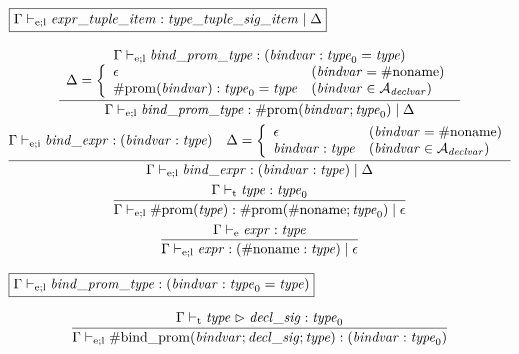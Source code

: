 $\fbox{$\Gamma \vdash_{\mathrm{e}; \mathrm{l}} \mathit{expr\_tuple\_item}: \mathit{type\_tuple\_sig\_item} \mid \Delta$}$

\begin{gather*}
    \infer{\Gamma \vdash_{\mathrm{e}; \mathrm{l}} \mathit{bind\_prom\_type}: \mathrm{\#prom}(\mathit{bindvar}; \mathit{type}_0) \mid \Delta}{
        \begin{array}{c}
            \Gamma \vdash_{\mathrm{e}; \mathrm{l}} \mathit{bind\_prom\_type}: (\mathit{bindvar}: \mathit{type}_0 = \mathit{type})
            \\
            \Delta = \left\{\begin{array}{ll}
                \epsilon &(\mathit{bindvar} = \mathrm{\#noname}) \\
                \mathrm{\#prom}(\mathit{bindvar}): \mathit{type}_0 = \mathit{type} &(\mathit{bindvar} \in \mathcal{A}_\mathit{declvar})
            \end{array}\right.
        \end{array}
    }
    \\
    \infer{\Gamma \vdash_{\mathrm{e}; \mathrm{l}} \mathit{bind\_expr}: (\mathit{bindvar}: \mathit{type}) \mid \Delta}{
        \Gamma \vdash_{\mathrm{e}; \mathrm{i}} \mathit{bind\_expr}: (\mathit{bindvar}: \mathit{type})
        &
        \Delta = \left\{\begin{array}{ll}
            \epsilon &(\mathit{bindvar} = \mathrm{\#noname}) \\
            \mathit{bindvar}: \mathit{type} &(\mathit{bindvar} \in \mathcal{A}_\mathit{declvar})
        \end{array}\right.
    }
    \\
    \infer{\Gamma \vdash_{\mathrm{e}; \mathrm{l}} \mathrm{\#prom}(\mathit{type}): \mathrm{\#prom}(\mathrm{\#noname}; \mathit{type}_0) \mid \epsilon}{
        \Gamma \vdash_\mathrm{t} \mathit{type}: \mathit{type}_0
    }
    \\
    \infer{\Gamma \vdash_{\mathrm{e}; \mathrm{l}} \mathit{expr}: (\mathrm{\#noname}: \mathit{type}) \mid \epsilon}{
        \Gamma \vdash_\mathrm{e} \mathit{expr}: \mathit{type}
    }
\end{gather*}

$\fbox{$\Gamma \vdash_{\mathrm{e}; \mathrm{l}} \mathit{bind\_prom\_type}: (\mathit{bindvar}: \mathit{type}_0 = \mathit{type})$}$

\begin{gather*}
    \infer{\Gamma \vdash_{\mathrm{e}; \mathrm{l}} \mathrm{\#bind\_prom}(\mathit{bindvar}; \mathit{decl\_sig}; \mathit{type}): (\mathit{bindvar}: \mathit{type}_0)}{
        \Gamma \vdash_\mathrm{t} \mathit{type} \vartriangleright \mathit{decl\_sig}: \mathit{type}_0
    }
\end{gather*}

